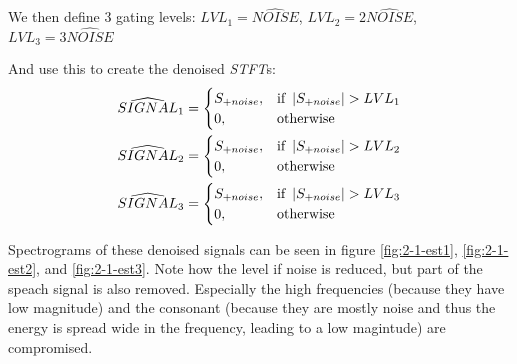 We then define $3$ gating levels: $LVL_1 = \widehat{NOISE}$, $LVL_2 =
2\widehat{NOISE}$, $LVL_3 = 3\widehat{NOISE}$

And use this to create the denoised \emph{STFT}s:
\begin{gather*}
\widehat{SIGNAL}_1 = \begin{cases}
      				S_{+noise}, & \text{if}\ \left| {S_{+noise}} \right| > LVL_1 \\
      				0, & \text{otherwise}
    			 \end{cases}
\\
\widehat{SIGNAL}_2 = \begin{cases}
      				S_{+noise}, & \text{if}\ \left| {S_{+noise}} \right| > LVL_2 \\
      				0, & \text{otherwise}
    			 \end{cases}
\\
\widehat{SIGNAL}_3 = \begin{cases}
      				S_{+noise}, & \text{if}\ \left| {S_{+noise}} \right| > LVL_3 \\
      				0, & \text{otherwise}
    			 \end{cases}
\end{gather*}

Spectrograms of these denoised signals can be seen in figure
\ref{fig:2-1-est1}, \ref{fig:2-1-est2}, and \ref{fig:2-1-est3}.
Note how the level if noise is reduced, but part of the speach signal is also
removed. Especially the high frequencies (because they have low magnitude) and
the consonant (because they are mostly noise and thus the energy is spread wide
in the frequency, leading to a low magintude) are compromised.




